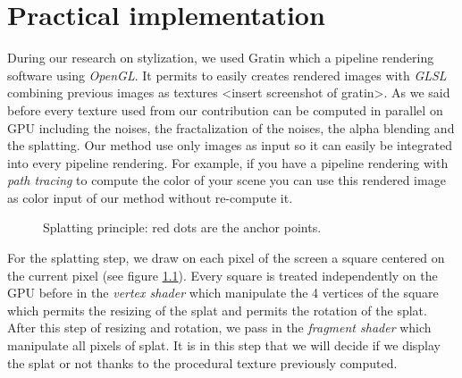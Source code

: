 \chapter{Practical implementation}




During our research on stylization, we used Gratin which a pipeline rendering software using \textit{OpenGL}. It permits to easily creates rendered images with \textit{GLSL} combining previous images as textures <insert screenshot of gratin>. As we said before every texture used from our contribution can be computed in parallel on GPU including the noises, the fractalization of the noises, the alpha blending and the splatting. Our method use only images as input so it can easily be integrated into every pipeline rendering. For example, if you have a pipeline rendering with \textit{path tracing} to compute the color of your scene you can use this rendered image as color input of our method without re-compute it.\newline

\begin{figure}
    \begin{center}
    \end{center}
    \caption{Splatting principle: red dots are the anchor points.}
    \label{splatting_principle}
\end{figure}

For the splatting step, we draw on each pixel of the screen a square centered on the current pixel (see figure \ref{splatting_principle}). Every square is treated independently on the GPU before in the \textit{vertex shader} which manipulate the 4 vertices of the square which permits the resizing of the splat and permits the rotation of the splat. After this step of resizing and rotation, we pass in the \textit{fragment shader} which manipulate all pixels of splat. It is in this step that we will decide if we display the splat or not thanks to the procedural texture previously computed. \newline

